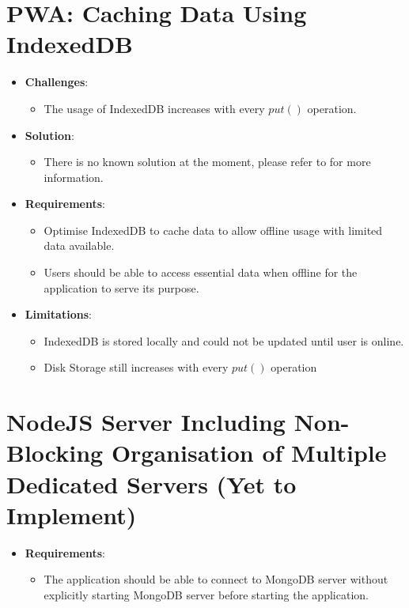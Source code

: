 \documentclass[11pt, a4paper]{article}
\begin{document}
\section{PWA: Caching Data Using IndexedDB}
\begin{itemize}
  \item \textbf{Challenges}:
  \begin{itemize}
    \item The usage of IndexedDB increases with every $put()$ operation.
  \end{itemize}
  \item \textbf{Solution}:
  \begin{itemize}
    \item There is no known solution at the moment, please refer to \cite{leveldb_593, leveldb_603} for 
    more information.
  \end{itemize}
  \item \textbf{Requirements}:
  \begin{itemize}
    \item Optimise IndexedDB to cache data to allow offline usage with limited data available.
    \item Users should be able to access essential data when offline for the application to serve its 
    purpose.
  \end{itemize}
  \item \textbf{Limitations}: 
  \begin{itemize}
    \item IndexedDB is stored locally and could not be updated until user is online.
    \item Disk Storage still increases with every $put()$ operation
  \end{itemize}
\end{itemize}

\section{NodeJS Server Including Non-Blocking Organisation of Multiple Dedicated Servers (Yet to Implement)}
\begin{itemize}
  \item \textbf{Requirements}:
  \begin{itemize}
    \item The application should be able to connect to MongoDB server without explicitly starting MongoDB 
    server before starting the application. 
  \end{itemize}
\end{itemize}
\end{document}
